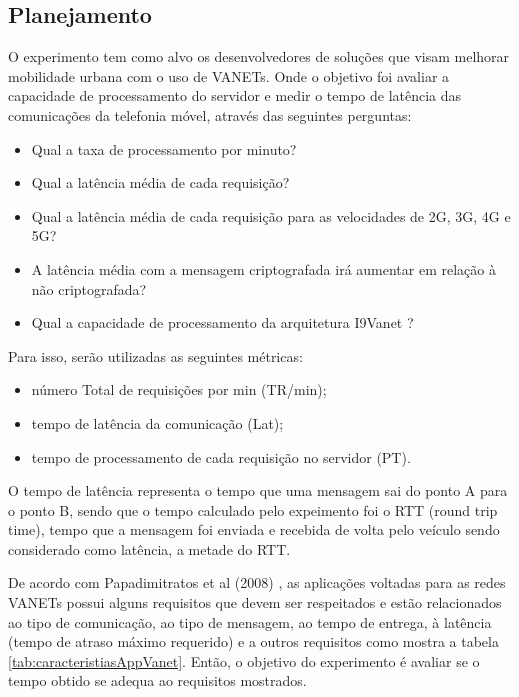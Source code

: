 \documentclass[
	12pt,				%
	oneside,			%
	a4paper,			%
	english,			%
	brazil				%
	]{abntex2ppgsi}
\begin{document}
\subsection{Planejamento}
O experimento tem como alvo os desenvolvedores de soluções que visam melhorar mobilidade urbana com o uso de VANETs. Onde o objetivo foi avaliar a capacidade de processamento do servidor e medir o tempo de latência das comunicações da telefonia móvel, através das seguintes perguntas:
\begin{itemize}
	\item {Qual a taxa de processamento por minuto?}
	\item {Qual a latência média de cada requisição?}
	\item {Qual a latência média de cada requisição para as velocidades de 2G, 3G, 4G e 5G?}
	\item {A latência média com a mensagem criptografada irá aumentar em relação à não criptografada?}
	\item {Qual a capacidade de processamento da arquitetura I9Vanet ?}
\end{itemize} 

Para isso, serão utilizadas as seguintes métricas: 
\begin{itemize}
	\item {número Total de requisições por min (TR/min);}
	\item {tempo de latência da comunicação (Lat);}
	\item {tempo de processamento de cada requisição no servidor (PT).}
\end{itemize} 

O tempo de latência representa o tempo que uma mensagem sai do ponto A para o ponto B, sendo que o tempo calculado pelo expeimento foi o RTT (round trip time), tempo que a mensagem foi enviada e recebida de volta pelo veículo sendo considerado como latência, a metade do RTT.

De acordo com Papadimitratos et al (2008) \nocite{papadimitratos2008secure},  as aplicações voltadas para as redes VANETs possui alguns requisitos que devem ser respeitados e estão relacionados ao tipo de comunicação, ao tipo de mensagem, ao tempo de entrega, à latência (tempo de atraso máximo requerido)  e a outros requisitos como mostra a tabela \ref{tab:caracteristiasAppVanet}. Então, o objetivo do experimento é avaliar se o tempo obtido se adequa ao requisitos mostrados.
\end{document}
